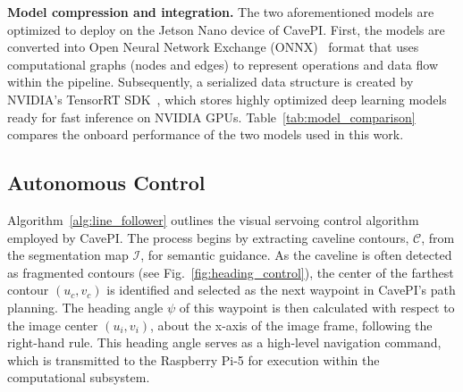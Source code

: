\begin{table}[h]
    \centering
    \renewcommand{\arraystretch}{1.2}
    \caption{Edge performances (on a Jetson Nano device) for the two model configurations (Fig.~\ref{fig:model}) available in CavePI are compared.}
    \label{tab:model_comparison}
    \vspace{-1mm}
\end{table}


\vspace{1mm}
\noindent
\textbf{Model compression and integration.} The two aforementioned models are optimized to deploy on the Jetson Nano device of CavePI. First, the models are converted into Open Neural Network Exchange (ONNX)~\cite{onnx} format that uses computational graphs (nodes and edges) to represent operations and data flow within the pipeline. Subsequently, a serialized data structure is created by NVIDIA's TensorRT SDK~\cite{tensorrt}, which stores highly optimized deep learning models ready for fast inference on NVIDIA GPUs. Table~\ref{tab:model_comparison} compares the onboard performance of the two models used in this work.



\subsection{Autonomous Control} 
Algorithm~\ref{alg:line_follower} outlines the visual servoing control algorithm employed by CavePI. The process begins by extracting caveline contours, $\mathcal{C}$, from the segmentation map $\mathcal{I}$, for semantic guidance. As the caveline is often detected as fragmented contours (see Fig.~\ref{fig:heading_control}), the center of the farthest contour $(u_c, v_c)$ is identified and selected as the next waypoint in CavePI's path planning. The heading angle $\psi$ of this waypoint is then calculated with respect to the image center $(u_i, v_i)$, about the x-axis of the image frame, following the right-hand rule. This heading angle serves as a high-level navigation command, which is transmitted to the Raspberry Pi-5 for execution within the computational subsystem. 


